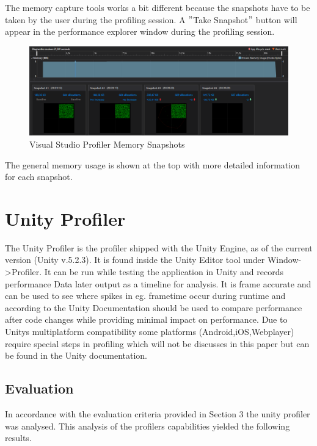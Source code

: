 The memory capture tools works a bit different because the snapshots have to be taken by the user during the profiling session.
A $"$Take Snapshot$"$ button will appear in the performance explorer window during the profiling session.

\begin{figure}[htbp]
\includegraphics[scale = 0.23]{img/VisMemorySnapshots.PNG}
\caption{Visual Studio Profiler Memory Snapshots}
\label{fig:VisualStudioProfilerMemorySnapshots}
\end{figure}

The general memory usage is shown at the top with more detailed information for each snapshot.

\section{Unity Profiler}

The Unity Profiler is the profiler shipped with the Unity Engine, as of the current version (Unity v.5.2.3). It is found inside the Unity Editor tool under Window->Profiler. It can be run while testing the application in Unity and records performance Data later output as a timeline for analysis. It is frame accurate and can be used to see where spikes in eg. frametime occur during runtime and according to the Unity Documentation should be used to compare performance after code changes while providing minimal impact on performance.
Due to Unitys multiplatform compatibility some platforms (Android,iOS,Webplayer) require special steps in profiling which will not be discusses in this paper but can be found in the Unity documentation.


\subsection{Evaluation}

In accordance with the evaluation criteria provided in Section 3 the unity profiler was analysed. This analysis of the profilers capabilities yielded the following results.

